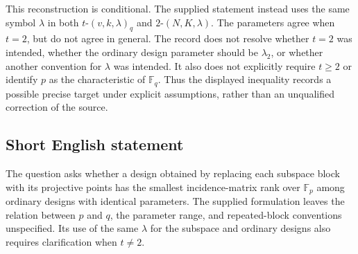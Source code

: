 \documentclass[11pt]{article}
\newcommand{\F}{\mathbb{F}}
\begin{document}
This reconstruction is conditional. The supplied statement instead uses the same symbol \(\lambda\) in both \(t\text{-}(v,k,\lambda)_q\) and \(2\text{-}(N,K,\lambda)\). The parameters agree when \(t=2\), but do not agree in general. The record does not resolve whether \(t=2\) was intended, whether the ordinary design parameter should be \(\lambda_2\), or whether another convention for \(\lambda\) was intended. It also does not explicitly require \(t\geq2\) or identify \(p\) as the characteristic of \(\F_q\). Thus the displayed inequality records a possible precise target under explicit assumptions, rather than an unqualified correction of the source.
\subsection{Short English statement}
The question asks whether a design obtained by replacing each subspace block with its projective points has the smallest incidence-matrix rank over \(\F_p\) among ordinary designs with identical parameters. The supplied formulation leaves the relation between \(p\) and \(q\), the parameter range, and repeated-block conventions unspecified. Its use of the same \(\lambda\) for the subspace and ordinary designs also requires clarification when \(t\neq2\).
\end{document}
